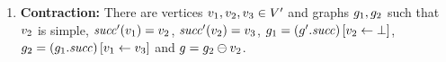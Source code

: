 {\begin{enumerate}
\begin{enumerate}
\begin{enumerate}
    where $\graph=\graph_1\addVarAsSuccOf{\xvar}{\yvar}$.
  \item \label{pre:case:dotNextAssignedC}%
    $\labeling_1(\xvar)\neq\undef$, %
    $\suc(\labeling_1(\xvar))=\undef$, %
    $\labeling_1(\yvar)\neq\undef$, %
    $\labeling_1(\xvar)\neq\labeling_1(\nil)$ %
    and %
    $\graph_2=\graph_1$.
  \item \label{pre:case:dotNextAssignedD}%
    $\labeling_1(\xvar)\neq\undef$, %
    $\suc(\labeling_1(\xvar))=\undef$, %
    $\labeling_1(\yvar)=\undef$, %
    $\labeling_1(\xvar)\neq\labeling_1(\nil)$ and %
    $\graph_2\in\graph_1\addVar{\yvar}$.
  \item \label{pre:case:dotNextAssignedE}%
    $\labeling_1(\xvar)=\undef$,%
    $\labeling_1(\yvar)\neq\undef$ and %
    $\graph_2=\graph\delEdge{\xvar}$, where %
    $\graph\in\graph_1\addVarAsPredOf{\yvar}{\xvar}$.
  \item \label{pre:case:dotNextAssignedF}%
    $\labeling_1(\xvar)=\undef$, %
    $\labeling_1(\yvar)=\undef$ and %
    there are graphs $\graph,\graph'$ such that
    $\graph\in\graph_1\addVar{\yvar}$, %
    $\graph'\in\graph\addVarAsPredOf{\yvar}{\xvar}$ and %
    $\graph_2=\graph'\delEdge{\xvar}$.
  \end{enumerate}
\end{enumerate}
\item {\bf Contraction:}
 There are
 vertices $v_1,v_2,v_3\in V'$ and graphs
 $g_1,g_2$ such that $v_2$ is simple,
 ${\it succ}'(v_1)=v_2$, ${\it succ}'(v_2)=v_3$,
 $g_1=\left(g'.{\it succ}\right)\left[v_2\leftarrow\bot\right]$,
 $g_2=\left(g_1.{\it succ}\right)\left[v_1\leftarrow v_3\right]$
 and $g=g_2\ominus{\ensuremath{v}_2}$.


\end{enumerate}}
